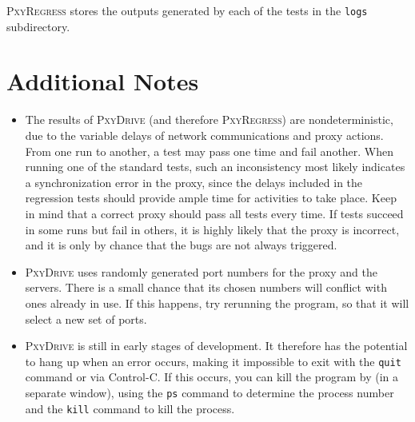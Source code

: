 \documentclass[11pt]{article}
\newcommand{\pxydrive}{\textsc{PxyDrive}}
\newcommand{\pxyregress}{\textsc{PxyRegress}}
\begin{document}
\pxyregress{} stores the outputs generated by each of the tests in the
\texttt{logs} subdirectory.

\section{Additional Notes}
\label{sec:notes}

\begin{itemize}
\item
The results of \pxydrive{} (and therefore \pxyregress{}) are
nondeterministic, due to the variable delays of network communications
and proxy actions.  From one run to another, a test may pass one time
and fail another.  When running one of the standard tests, such an
inconsistency most likely indicates a synchronization error in the
proxy, since the delays included in the regression tests should
provide ample time for activities to take place.  Keep in mind that a
correct proxy should pass all tests every time.  If tests succeed in
some runs but fail in others, it is highly likely that the proxy is
incorrect, and it is only by chance that the bugs are not always
triggered.

\item
\pxydrive{} uses randomly generated port numbers for the proxy and the
servers.  There is a small chance that its chosen numbers will
conflict with ones already in use.   If this happens, try rerunning
the program, so that it will select a new set of ports.


\item
\pxydrive{} is still in early stages
of development.  It therefore has the potential to hang up when an
error occurs, making it impossible to exit with the \texttt{quit}
command or via Control-C\@.  If this occurs, you can kill the program by
(in a separate window), using the \texttt{ps} command to determine the
process number and the \texttt{kill} command to kill the process.

\end{itemize}
\end{document}
